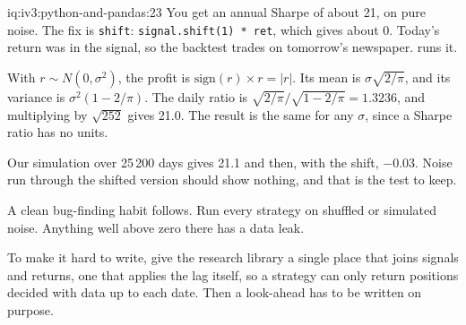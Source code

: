 \begin{solution}{iq:iv3:python-and-pandas:23}
You get an annual Sharpe of about 21, on pure noise. The fix is \texttt{shift}: \texttt{signal.shift(1) * ret}, which gives about 0. Today's return was in the signal, so the backtest trades on tomorrow's newspaper.  runs it.
\label{lst:iv3:pp:noise}

With $r \sim N(0, \sigma^2)$, the profit is $\text{sign}(r) \times r = |r|$. Its mean is $\sigma\sqrt{2/\pi}$, and its variance is $\sigma^2(1 - 2/\pi)$. The daily ratio is $\sqrt{2/\pi} / \sqrt{1 - 2/\pi} = 1.3236$, and multiplying by $\sqrt{252}$ gives 21.0. The result is the same for any $\sigma$, since a Sharpe ratio has no units.

Our simulation over 25\,200 days gives 21.1 and then, with the shift, $-0.03$. Noise run through the shifted version should show nothing, and that is the test to keep.

A clean bug-finding habit follows. Run every strategy on shuffled or simulated noise. Anything well above zero there has a data leak.

To make it hard to write, give the research library a single place that joins signals and returns, one that applies the lag itself, so a strategy can only return positions decided with data up to each date. Then a look-ahead has to be written on purpose.

\end{solution}

